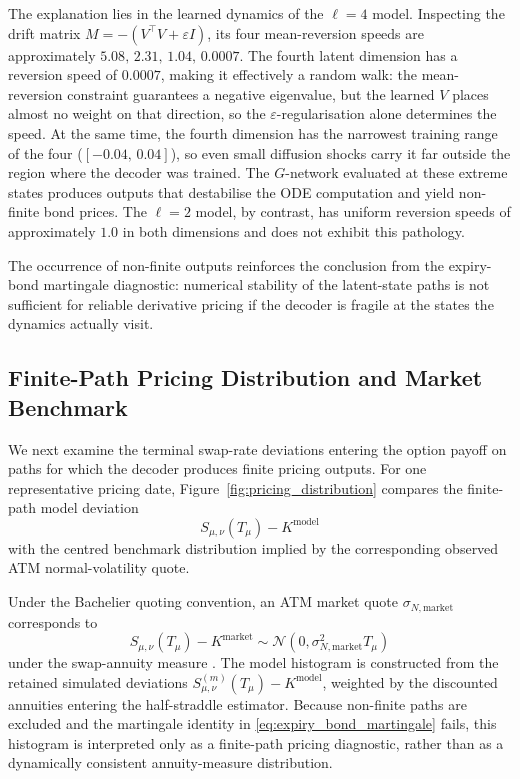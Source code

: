 The explanation lies in the learned dynamics of the \(\ell=4\) model. Inspecting the drift matrix \(M = -(V^\top V + \varepsilon I)\), its four mean-reversion speeds are approximately \(5.08,\, 2.31,\, 1.04,\, 0.0007\). The fourth latent dimension has a reversion speed of \(0.0007\), making it effectively a random walk: the mean-reversion constraint guarantees a negative eigenvalue, but the learned \(V\) places almost no weight on that direction, so the \(\varepsilon\)-regularisation alone determines the speed. At the same time, the fourth dimension has the narrowest training range of the four (\([-0.04,\, 0.04]\)), so even small diffusion shocks carry it far outside the region where the decoder was trained. The \(G\)-network evaluated at these extreme states produces outputs that destabilise the ODE computation and yield non-finite bond prices. The \(\ell=2\) model, by contrast, has uniform reversion speeds of approximately \(1.0\) in both dimensions and does not exhibit this pathology.

The occurrence of non-finite outputs reinforces the conclusion from the expiry-bond martingale diagnostic: numerical stability of the latent-state paths is not sufficient for reliable derivative pricing if the decoder is fragile at the states the dynamics actually visit.

\subsection{Finite-Path Pricing Distribution and Market Benchmark}
\label{subsec:pricing_distribution}

We next examine the terminal swap-rate deviations entering the option payoff on paths for which the decoder produces finite pricing outputs. For one representative pricing date, Figure~\ref{fig:pricing_distribution} compares the finite-path model deviation
\[
S_{\mu,\nu}(T_\mu)-K^{\mathrm{model}}
\]
with the centred benchmark distribution implied by the corresponding observed ATM normal-volatility quote.

Under the Bachelier quoting convention, an ATM market quote \(\sigma_{N,\mathrm{market}}\) corresponds to
\begin{equation}
S_{\mu,\nu}(T_\mu)-K^{\mathrm{market}}
\sim
\mathcal N\!\left(0,\sigma_{N,\mathrm{market}}^{2}T_\mu\right)
\label{eq:bachelier_benchmark_distribution}
\end{equation}
under the swap-annuity measure \citep{Bjork2020}. The model histogram is constructed from the retained simulated deviations \(S_{\mu,\nu}^{(m)}(T_\mu)-K^{\mathrm{model}}\), weighted by the discounted annuities entering the half-straddle estimator. Because non-finite paths are excluded and the martingale identity in \eqref{eq:expiry_bond_martingale} fails, this histogram is interpreted only as a finite-path pricing diagnostic, rather than as a dynamically consistent annuity-measure distribution.


